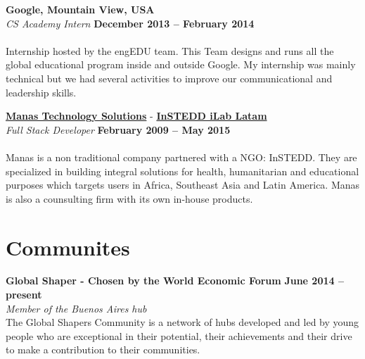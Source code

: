 \documentclass[margin,line]{resume}
\begin{document}
\begin{resume}
\textbf{Google, Mountain View, USA}\vspace{2mm}\\\vspace{1mm}
\textsl{CS Academy Intern} \hfill \textbf{December 2013 -- February 2014}\vspace{-3mm}\\\vspace{-1mm}
\\
Internship hosted by the engEDU team. This Team designs and runs all the global educational program inside and outside Google. My internship was mainly technical but we had several activities to improve our communicational and leadership skills.

\textbf{\href{http://www.manas.com.ar/}{Manas Technology Solutions}} - 
\textbf{\href{http://www.instedd.org/}{InSTEDD iLab Latam}}\vspace{2mm}\\\vspace{1mm}
\textsl{Full Stack Developer} \hfill \textbf{February 2009 -- May 2015}\vspace{-3mm}\\\vspace{-1mm}
\\
Manas is a non traditional company partnered with a NGO: InSTEDD. They are specialized in building integral solutions for health, humanitarian and educational purposes which targets users in Africa, Southeast Asia and Latin America. Manas is also a counsulting firm with its own in-house products.
\newpage


\section{\mysidestyle Communites}

\textbf{Global Shaper - Chosen by the World Economic Forum} \hfill \textbf{June 2014 -- present} \vspace{2mm}\\\vspace{1mm}
\textsl{Member of the Buenos Aires hub} \\
The Global Shapers Community is a network of hubs developed and led by young people who are exceptional in their potential, their achievements and their drive to make a contribution to their communities.



\end{resume}
\end{document}
